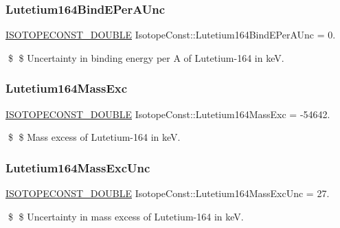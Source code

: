 \subsubsection{\texorpdfstring{Lutetium164\+Bind\+E\+Per\+A\+Unc}{Lutetium164BindEPerAUnc}}
{\footnotesize\ttfamily \mbox{\hyperlink{group___isotope_const-_macros_ga8f45a7272ce02c0b4c65c44636ed719a}{I\+S\+O\+T\+O\+P\+E\+C\+O\+N\+S\+T\+\_\+\+D\+O\+U\+B\+LE}} Isotope\+Const\+::\+Lutetium164\+Bind\+E\+Per\+A\+Unc = 0.}

\$ \$ Uncertainty in binding energy per A of Lutetium-\/164 in keV. \mbox{\label{group___isotope_const-_lutetium-_lu164_ga44b022730b248bfde9ffa5bd10b80fdc}} 
\subsubsection{\texorpdfstring{Lutetium164\+Mass\+Exc}{Lutetium164MassExc}}
{\footnotesize\ttfamily \mbox{\hyperlink{group___isotope_const-_macros_ga8f45a7272ce02c0b4c65c44636ed719a}{I\+S\+O\+T\+O\+P\+E\+C\+O\+N\+S\+T\+\_\+\+D\+O\+U\+B\+LE}} Isotope\+Const\+::\+Lutetium164\+Mass\+Exc = -\/54642.}

\$ \$ Mass excess of Lutetium-\/164 in keV. \mbox{\label{group___isotope_const-_lutetium-_lu164_ga2970cdd7d795a7d72ed592e413b61688}} 
\subsubsection{\texorpdfstring{Lutetium164\+Mass\+Exc\+Unc}{Lutetium164MassExcUnc}}
{\footnotesize\ttfamily \mbox{\hyperlink{group___isotope_const-_macros_ga8f45a7272ce02c0b4c65c44636ed719a}{I\+S\+O\+T\+O\+P\+E\+C\+O\+N\+S\+T\+\_\+\+D\+O\+U\+B\+LE}} Isotope\+Const\+::\+Lutetium164\+Mass\+Exc\+Unc = 27.}

\$ \$ Uncertainty in mass excess of Lutetium-\/164 in keV. \mbox{\label{group___isotope_const-_lutetium-_lu164_gac60d9b3aefe05dd11f36bd40bc381475}} 
